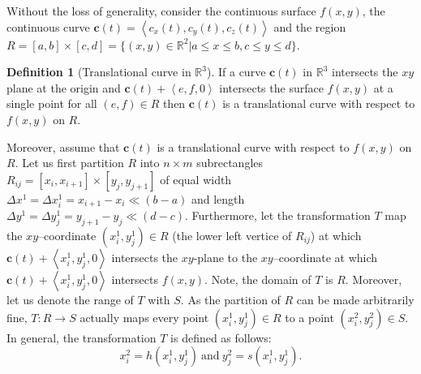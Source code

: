\documentclass{article}
\theoremstyle{theorem}
\theoremstyle{definition}
\newtheorem*{definition}{Definition}
\begin{document}
\noindent
Without the loss of generality, consider the continuous surface $f(x,y)$, the continuous curve $\mathbf{c}(t)=\left <c_x(t),c_y(t), c_z(t) \right >$ and the region $R = [a,b]\times [c,d] = \{(x,y)\in \mathbb{R}^2|a \leq x \leq b, c \leq y \leq d\}$.

\begin{definition}[Translational curve in $\mathbb{R}^3$]
If a curve $\mathbf{c}(t)$ in $\mathbb{R}^3$ intersects the $xy$ plane at the origin and $\mathbf{c}(t) + \left < e,f,0 \right >$ intersects 
the surface $f(x,y)$ at a single point for all $(e,f)\in R$ then $\mathbf{c}(t)$ is a translational curve 
with respect to $f(x,y)$ on $R$. 
\end{definition}

\noindent
Moreover, assume that $\mathbf{c}(t)$ is a translational curve with respect to $f(x,y)$ on $R$. Let us first partition $R$ into $n\times m$ subrectangles $R_{ij} = [x_{i},x_{i+1}] \times [y_{j},y_{j+1}]$ of equal width $\Delta x^1 = \Delta x_i^1 = x_{i+1}-x_i\ll (b-a)$ and length $\Delta y^1= \Delta y_j^1 = y_{j+1}-y_j\ll(d-c)$.
Furthermore, let the transformation $T$ map the $xy$--coordinate $(x_i^1,y_j^1)\in R$ (the lower left vertice of $R_{ij}$) at which $\mathbf{c}(t) + \left <x_i^1,y_j^1,0 \right >$ intersects the 
$xy$-plane to the $xy$--coordinate at which $\mathbf{c}(t) + \left <x_i^1,y_j^1,0 \right >$ intersects $f(x,y)$. Note, the domain of $T$ is $R$. Moreover, let us denote the range 
of $T$ with $S$. As the partition of $R$ can be made arbitrarily fine, $T:R\rightarrow S$ actually maps every point $(x_i^1,y_j^1)\in R$ to a point $(x_i^2,y_j^2)\in S$. In general, the transformation $T$ is defined as follows:
\begin{equation}
x_i^2 = h(x_i^1,y_j^1)~\textrm{and}~y_j^2 = s(x_i^1,y_j^1).
\end{equation}



\end{document}
